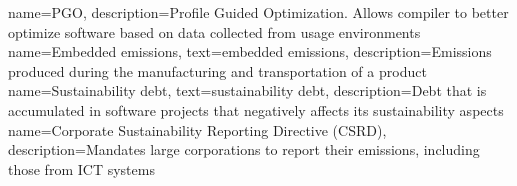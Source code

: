 {
    name=PGO,
    description={Profile Guided Optimization. Allows compiler to better optimize software based on data collected from usage environments}
}
{
    name=Embedded emissions,
    text=embedded emissions,
    description={Emissions produced during the manufacturing and transportation of a product}
}
{
    name=Sustainability debt,
    text=sustainability debt,
    description={Debt that is accumulated in software projects that negatively affects its sustainability aspects~\cite{sustainabilitydebt}}
}
{
    name={Corporate Sustainability Reporting Directive (CSRD)},
    description={Mandates large corporations to report their emissions, including those from ICT systems~\cite{europaDirective20222464}}
}